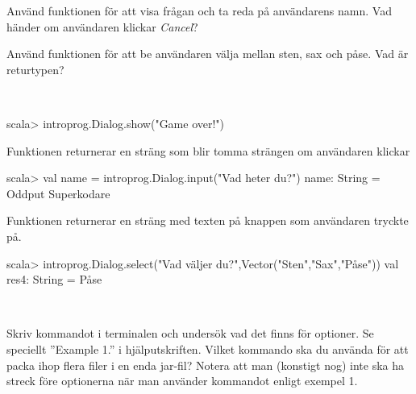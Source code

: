 \Subtask Använd funktionen  för att visa frågan  och ta reda på användarens namn. Vad händer om användaren klickar \emph{Cancel}?

\Subtask Använd funktionen  för att be användaren välja mellan sten, sax och påse. Vad är returtypen?


\SOLUTION

\TaskSolved \what~

\SubtaskSolved
\begin{REPL}
scala> introprog.Dialog.show("Game over!")
\end{REPL}

\SubtaskSolved Funktionen  returnerar en sträng som blir tomma strängen  om användaren klickar 
\begin{REPL}
scala> val name = introprog.Dialog.input("Vad heter du?")
name: String = Oddput Superkodare
\end{REPL}

\SubtaskSolved Funktionen  returnerar en sträng med texten på knappen som användaren tryckte på.
\begin{REPL}
scala> introprog.Dialog.select("Vad väljer du?",Vector("Sten","Sax","Påse"))
val res4: String = Påse
\end{REPL}

\QUESTEND





\QUESTBEGIN

\Task\Uberkurs  \what~

\Subtask Skriv kommandot  i terminalen och undersök vad det finns för optioner. Se speciellt ''Example 1.'' i hjälputskriften. Vilket kommando ska du använda för att packa ihop flera filer i en enda jar-fil? Notera att man (konstigt nog) inte ska ha streck före optionerna när man använder kommandot  enligt exempel 1.


